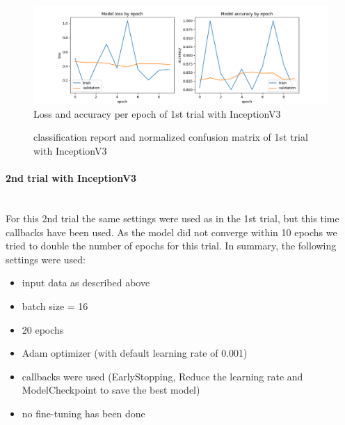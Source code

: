 \documentclass{article}
\begin{document}
\begin{figure}[ht] %
    \centering
    \includegraphics[width=1.0\linewidth]{inceptionv3_04_loss_accuracy.png}
    \caption{Loss and accuracy per epoch of 1st trial with InceptionV3}
    \label{fig:inceptionv3_04_loss_accuracy}
\end{figure}

\begin{figure}[ht]
  \centering
  \qquad
  \caption{classification report and normalized confusion matrix of 1st trial with InceptionV3}
  \label{fig:inceptionv3_04_results}
\end{figure}



\paragraph{2nd trial with InceptionV3}\mbox{}\\
For this 2nd trial the same settings were used as in the 1st trial, but this time callbacks have been used. As the model did not converge within 10 epochs we tried to double the number of epochs for this trial. In summary, the following settings were used: 
\begin{itemize}
\item input data as described above
\item batch size = 16
\item 20 epochs 
\item Adam optimizer (with default learning rate of 0.001)
\item callbacks were used (EarlyStopping, Reduce the learning rate and ModelCheckpoint to save the best model)
\item no fine-tuning has been done
\end{itemize}
\end{document}
